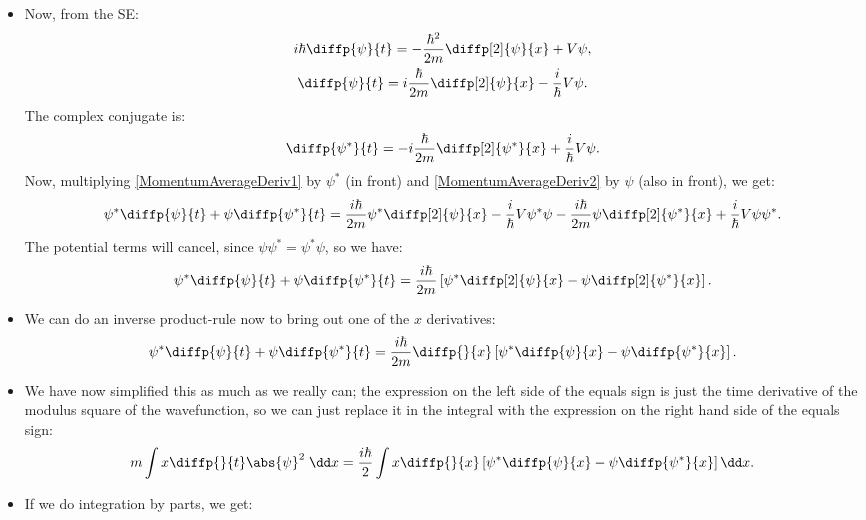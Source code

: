 \begin{itemize}
    \item Now, from the SE:
        \begin{gather}
            i\hbar \diffp{\psi}{t} = -\frac{\hbar^2}{2m} \diffp[2]{\psi}{x} + V\psi, \\
            \diffp{\psi}{t} = i\frac{\hbar}{2m} \diffp[2]{\psi}{x} -\frac{i}{\hbar} V\psi.\label{MomentumAverageDeriv1}
        \end{gather}
        The complex conjugate is:
        \begin{equation}
            \diffp{\psi^*}{t} = -i\frac{\hbar}{2m} \diffp[2]{\psi^*}{x} + \frac{i}{\hbar} V\psi.\label{MomentumAverageDeriv2}
        \end{equation}
        Now, multiplying \eqref{MomentumAverageDeriv1} by $\psi^*$ (in front) and \eqref{MomentumAverageDeriv2} by $\psi$ (also in front), we get:
        \begin{equation*}
            \psi^*\diffp{\psi}{t} + \psi\diffp{\psi^*}{t} = \frac{i\hbar}{2m}\psi^*\diffp[2]{\psi}{x} - \frac{i}{\hbar} V\psi^*\psi - \frac{i\hbar}{2m} \psi\diffp[2]{\psi^*}{x} + \frac{i}{\hbar}V\psi\psi^*.
        \end{equation*}
        The potential terms will cancel, since $\psi\psi^* = \psi^*\psi$, so we have:
        \begin{equation*}
            \psi^*\diffp{\psi}{t} + \psi\diffp{\psi^*}{t} = \frac{i\hbar}{2m}\left[\psi^*\diffp[2]{\psi}{x}- \psi\diffp[2]{\psi^*}{x}\right].
        \end{equation*}
    \item We can do an inverse product-rule now to bring out one of the $x$ derivatives:
        \begin{equation*}
            \psi^*\diffp{\psi}{t} + \psi\diffp{\psi^*}{t} = \frac{i\hbar}{2m}\diffp{}{x}\left[\psi^*\diffp{\psi}{x}- \psi\diffp{\psi^*}{x}\right].
        \end{equation*}
    \item We have now simplified this as much as we really can; the expression on the left side of the equals sign is just the time derivative of the modulus square of the wavefunction, so we can just replace it in the integral with the expression on the right hand side of the equals sign:
        \begin{equation*}
            m\int x\diffp{}{t}\abs{\psi}^2 \;\dd x = \frac{i\hbar}{2}\int x\diffp{}{x}\left[\psi^*\diffp{\psi}{x}- \psi\diffp{\psi^*}{x}\right] \dd x.
        \end{equation*}
    \item If we do integration by parts, we get:

\end{itemize}
